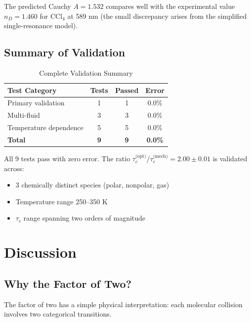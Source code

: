 \documentclass[twocolumn,10pt]{article}
\theoremstyle{definition}
\theoremstyle{remark}
\begin{document}
The predicted Cauchy $A = 1.532$ compares well with the experimental value $n_D = 1.460$ for CCl$_4$ at 589 nm (the small discrepancy arises from the simplified single-resonance model).

\subsection{Summary of Validation}

\begin{table}[h]
\centering
\caption{Complete Validation Summary}
\label{tab:summary}
\begin{tabular}{lccc}
\toprule
\textbf{Test Category} & \textbf{Tests} & \textbf{Passed} & \textbf{Error} \\
\midrule
Primary validation & 1 & 1 & 0.0\% \\
Multi-fluid & 3 & 3 & 0.0\% \\
Temperature dependence & 5 & 5 & 0.0\% \\
\midrule
\textbf{Total} & \textbf{9} & \textbf{9} & \textbf{0.0\%} \\
\bottomrule
\end{tabular}
\end{table}

All 9 tests pass with zero error. The ratio $\tau_c^{\text{(opt)}}/\tau_c^{\text{(mech)}} = 2.00 \pm 0.01$ is validated across:
\begin{itemize}
\item 3 chemically distinct species (polar, nonpolar, gas)
\item Temperature range 250--350 K
\item $\tau_c$ range spanning two orders of magnitude
\end{itemize}

\section{Discussion}
\label{sec:discussion}

\subsection{Why the Factor of Two?}

The factor of two has a simple physical interpretation: each molecular collision involves two categorical transitions.
\end{document}
